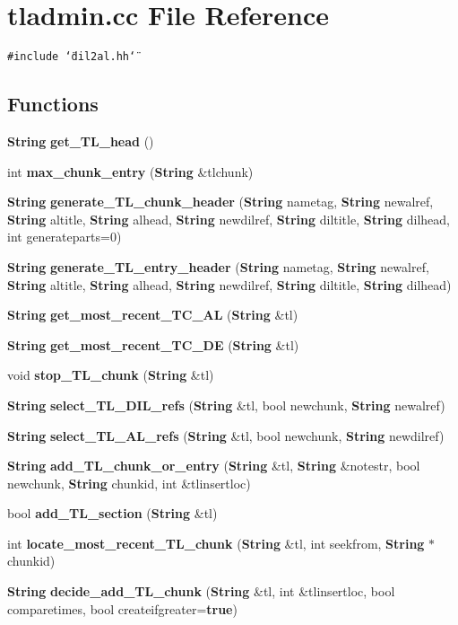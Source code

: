 \section{tladmin.cc File Reference}
\label{tladmin_8cc}
{\tt \#include \char`\"{}dil2al.hh\char`\"{}}\par
\subsection*{Functions}
\begin{CompactItemize}
\item 
{\bf String} {\bf get\_\-TL\_\-head} ()
\item 
int {\bf max\_\-chunk\_\-entry} ({\bf String} \&tlchunk)
\item 
{\bf String} {\bf generate\_\-TL\_\-chunk\_\-header} ({\bf String} nametag, {\bf String} newalref, {\bf String} altitle, {\bf String} alhead, {\bf String} newdilref, {\bf String} diltitle, {\bf String} dilhead, int generateparts=0)
\item 
{\bf String} {\bf generate\_\-TL\_\-entry\_\-header} ({\bf String} nametag, {\bf String} newalref, {\bf String} altitle, {\bf String} alhead, {\bf String} newdilref, {\bf String} diltitle, {\bf String} dilhead)
\item 
{\bf String} {\bf get\_\-most\_\-recent\_\-TC\_\-AL} ({\bf String} \&tl)
\item 
{\bf String} {\bf get\_\-most\_\-recent\_\-TC\_\-DE} ({\bf String} \&tl)
\item 
void {\bf stop\_\-TL\_\-chunk} ({\bf String} \&tl)
\item 
{\bf String} {\bf select\_\-TL\_\-DIL\_\-refs} ({\bf String} \&tl, bool newchunk, {\bf String} newalref)
\item 
{\bf String} {\bf select\_\-TL\_\-AL\_\-refs} ({\bf String} \&tl, bool newchunk, {\bf String} newdilref)
\item 
{\bf String} {\bf add\_\-TL\_\-chunk\_\-or\_\-entry} ({\bf String} \&tl, {\bf String} \&notestr, bool newchunk, {\bf String} chunkid, int \&tlinsertloc)
\item 
bool {\bf add\_\-TL\_\-section} ({\bf String} \&tl)
\item 
int {\bf locate\_\-most\_\-recent\_\-TL\_\-chunk} ({\bf String} \&tl, int seekfrom, {\bf String} $\ast$chunkid)
\item 
{\bf String} {\bf decide\_\-add\_\-TL\_\-chunk} ({\bf String} \&tl, int \&tlinsertloc, bool comparetimes, bool createifgreater={\bf true})
\end{CompactItemize}


